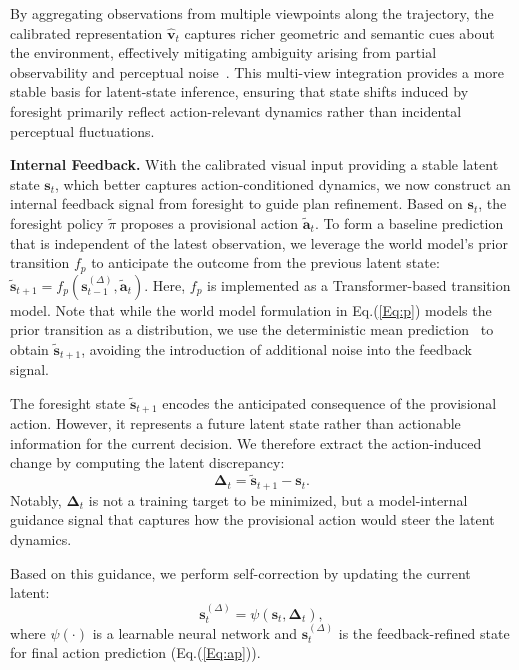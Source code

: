 \documentclass{article}
\theoremstyle{plain}
\theoremstyle{definition}
\theoremstyle{remark}
\begin{document}
By aggregating observations from multiple viewpoints along the trajectory, the calibrated representation $\hat{\boldsymbol{v}}_t$ captures richer geometric and semantic cues about the environment, effectively mitigating ambiguity arising from partial observability and perceptual noise~\cite{arandjelovic2016netvlad}. This multi-view integration provides a more stable basis for latent-state inference, ensuring that state shifts induced by foresight primarily reflect action-relevant dynamics rather than incidental perceptual fluctuations.




\noindent\textbf{Internal Feedback.}
With the calibrated visual input providing a stable latent state $\boldsymbol{s}_t$, which better captures action-conditioned dynamics, we now construct an internal feedback signal from foresight to guide plan refinement.
Based on $\boldsymbol{s}_t$, the foresight policy $\tilde{\pi}$ proposes a provisional action $\tilde{\boldsymbol{a}}_t$.
To form a baseline prediction that is independent of the latest observation, we leverage the world model's prior transition $f_p$ to anticipate the outcome from the previous latent state:
$\tilde{\boldsymbol{s}}_{t+1} = f_{p}(\boldsymbol{s}_{t-1}^{(\Delta)}, \tilde{\boldsymbol{a}}_t).$
Here, $f_p$ is implemented as a Transformer-based transition model.
Note that while the world model formulation in Eq.(\ref{Eq:p}) models the prior transition as a distribution, we use the deterministic mean prediction~\cite{min2024driveworld} to obtain $\tilde{\boldsymbol{s}}_{t+1}$, avoiding the introduction of additional noise into the feedback signal.

The foresight state $\tilde{\boldsymbol{s}}_{t+1}$ encodes the anticipated consequence of the provisional action.
However, it represents a future latent state rather than actionable information for the current decision.
We therefore extract the action-induced change by computing the latent discrepancy:
\begin{equation}
\boldsymbol{\Delta}_t = \tilde{\boldsymbol{s}}_{t+1} - \boldsymbol{s}_t.
\end{equation}
Notably, $\boldsymbol{\Delta}_t$ is not a training target to be minimized, but a model-internal guidance signal that captures how the provisional action would steer the latent dynamics. 


Based on this guidance, we perform self-correction by updating the current latent:
\begin{equation}\label{eq:psi}
\boldsymbol{s}_t^{(\Delta)} = \psi(\boldsymbol{s}_t, \boldsymbol{\Delta}_t), %
\end{equation}
where $\psi(\cdot)$ is a learnable neural network and $\boldsymbol{s}_t^{(\Delta)}$ is the feedback-refined state for final action prediction (Eq.(\ref{Eq:ap})).
\end{document}
